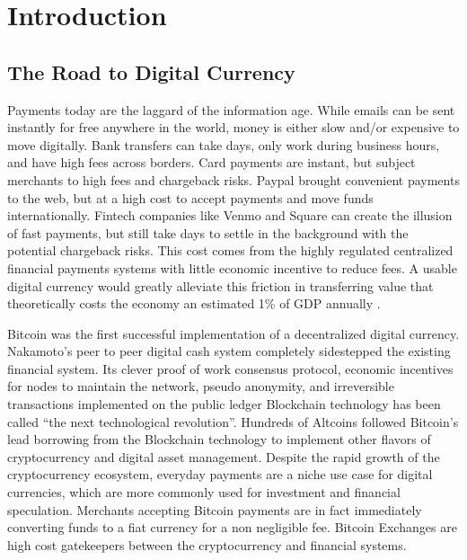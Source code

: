 \documentclass[a4paper,12pt]{article} %
\begin{document}
\pagebreak

\tableofcontents
\newpage

\listoffigures
\pagebreak

\listoftables
\pagebreak

\section{Introduction} \label{sec:1}

\subsection{The Road to Digital Currency} \label{ssec:1.1}
Payments today are the laggard of the information age. While emails can be sent instantly for free anywhere in the world, money is either slow and/or expensive to move digitally. Bank transfers can take days, only work during business hours, and have high fees across borders. Card payments are instant, but subject merchants to high fees and chargeback risks. Paypal brought convenient payments to the web, but at a high cost to accept payments and move funds internationally. Fintech companies like Venmo and Square can create the illusion of fast payments, but still take days to settle in the background with the potential chargeback risks. This cost comes from the highly regulated centralized financial payments systems with little economic incentive to reduce fees. A usable digital currency would greatly alleviate this friction in transferring value that theoretically costs the economy an estimated 1\% of GDP annually \cite{kaarmann2013cost}.

Bitcoin was the first successful implementation of a decentralized digital currency. Nakamoto's peer to peer digital cash system completely sidestepped the existing financial system\cite{nakamoto2008bitcoin}. Its clever proof of work consensus protocol, economic incentives for nodes to maintain the network, pseudo anonymity, and irreversible transactions implemented on the public ledger Blockchain technology has been called ``the next technological revolution''\cite{BlockchainRevolution}. Hundreds of Altcoins followed Bitcoin's lead borrowing from the Blockchain technology to implement other flavors of cryptocurrency and digital asset management\cite{coinMarketCap}. Despite the rapid growth of the cryptocurrency ecosystem, everyday payments are a niche use case for digital currencies, which are more commonly used for investment and financial speculation\cite{Khairuddin:2016:EMB:2851581.2892500}. Merchants accepting Bitcoin payments are in fact immediately converting funds to a fiat currency for a non negligible fee. Bitcoin Exchanges are high cost gatekeepers between the cryptocurrency and financial systems.
\end{document}
